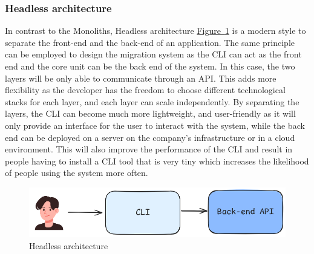 \documentclass{article}
\newcommand{\FigRef}[1]{\hyperref[#1]{Figure~\ref{#1}}}
\begin{document}
\begin{multicols}{2}
\subsubsection{Headless architecture}
In contrast to the Monoliths, Headless architecture \FigRef{fig:headless-architecture} is a modern style to separate the front-end and the back-end of an application. The same principle can be employed to design the migration system as the CLI can act as the front end and the core unit can be the back end of the system. In this case, the two layers will be only able to communicate through an API. This adds more flexibility as the developer has the freedom to choose different technological stacks for each layer, and each layer can scale independently. By separating the layers, the CLI can become much more lightweight, and user-friendly as it will only provide an interface for the user to interact with the system, while the back end can be deployed on a server on the company's infrastructure or in a cloud environment. This will also improve the performance of the CLI and result in people having to install a CLI tool that is very tiny which increases the likelihood of people using the system more often.

\begin{figure}[H]
    \centering
    \includegraphics[width=\linewidth]{images/headless-architecture.png}
    \caption{Headless architecture}
    \label{fig:headless-architecture}
\end{figure}


\end{multicols}
\end{document}
